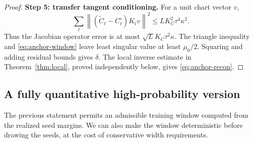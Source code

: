 \documentclass[12pt,a4paper]{article}
\theoremstyle{readable}
\theoremstyle{definition}\newtheorem{example}[theorem]{Example}
\newcommand{\norm}[1]{\left\|#1\right\|}
\begin{document}
\begin{proof}
\textbf{Step 5: transfer tangent conditioning.} For a unit chart vector \(v\),
\[
\sum_\ell\norm{(\widetilde C_\ell-C_\ell^\circ)K_iv}^2
\le L K_C^2\tau^4\kappa^2.
\]
Thus the Jacobian operator error is at most \(\sqrt L K_C\tau^2\kappa\). The triangle inequality and \eqref{eq:anchor-window} leave least singular value at least \(\mu_0/2\). Squaring and adding residual bounds gives \(\delta\). The local inverse estimate in Theorem~\ref{thm:local}, proved independently below, gives \eqref{eq:anchor-recon}.
\end{proof}

\subsection{A fully quantitative high-probability version}
The previous statement permits an admissible training window computed from the realized seed margins. We can also make the window deterministic before drawing the seeds, at the cost of conservative width requirements.
\end{document}
